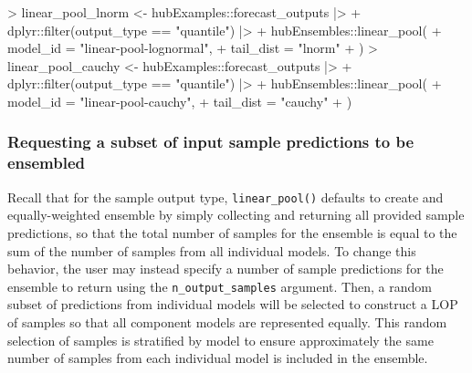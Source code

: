 \documentclass[
  letterpaper,
  DIV=11,
  numbers=noendperiod]{scrartcl}
\newenvironment{Shaded}{\begin{snugshade}}{\end{snugshade}}
\newcommand{\AttributeTok}[1]{\textcolor[rgb]{0.40,0.45,0.13}{#1}}
\newcommand{\FunctionTok}[1]{\textcolor[rgb]{0.28,0.35,0.67}{#1}}
\newcommand{\NormalTok}[1]{\textcolor[rgb]{0.00,0.23,0.31}{#1}}
\newcommand{\OtherTok}[1]{\textcolor[rgb]{0.00,0.23,0.31}{#1}}
\newcommand{\SpecialCharTok}[1]{\textcolor[rgb]{0.37,0.37,0.37}{#1}}
\newcommand{\StringTok}[1]{\textcolor[rgb]{0.13,0.47,0.30}{#1}}
\begin{document}
\begin{Shaded}
\begin{Highlighting}[]
\SpecialCharTok{\textgreater{}}\NormalTok{ linear\_pool\_lnorm }\OtherTok{\textless{}{-}}\NormalTok{ hubExamples}\SpecialCharTok{::}\NormalTok{forecast\_outputs }\SpecialCharTok{|\textgreater{}}
\SpecialCharTok{+}\NormalTok{     dplyr}\SpecialCharTok{::}\FunctionTok{filter}\NormalTok{(output\_type }\SpecialCharTok{==} \StringTok{"quantile"}\NormalTok{) }\SpecialCharTok{|\textgreater{}}
\SpecialCharTok{+}\NormalTok{     hubEnsembles}\SpecialCharTok{::}\FunctionTok{linear\_pool}\NormalTok{(}
\SpecialCharTok{+}       \AttributeTok{model\_id =} \StringTok{"linear{-}pool{-}lognormal"}\NormalTok{,}
\SpecialCharTok{+}       \AttributeTok{tail\_dist =} \StringTok{"lnorm"}
\SpecialCharTok{+}\NormalTok{     )}
\SpecialCharTok{\textgreater{}}\NormalTok{   linear\_pool\_cauchy }\OtherTok{\textless{}{-}}\NormalTok{ hubExamples}\SpecialCharTok{::}\NormalTok{forecast\_outputs }\SpecialCharTok{|\textgreater{}}
\SpecialCharTok{+}\NormalTok{     dplyr}\SpecialCharTok{::}\FunctionTok{filter}\NormalTok{(output\_type }\SpecialCharTok{==} \StringTok{"quantile"}\NormalTok{) }\SpecialCharTok{|\textgreater{}}
\SpecialCharTok{+}\NormalTok{     hubEnsembles}\SpecialCharTok{::}\FunctionTok{linear\_pool}\NormalTok{(}
\SpecialCharTok{+}       \AttributeTok{model\_id =} \StringTok{"linear{-}pool{-}cauchy"}\NormalTok{,}
\SpecialCharTok{+}       \AttributeTok{tail\_dist =} \StringTok{"cauchy"}
\SpecialCharTok{+}\NormalTok{     )}
\end{Highlighting}
\end{Shaded}

\subsubsection{Requesting a subset of input sample predictions to be
ensembled}\label{requesting-a-subset-of-input-sample-predictions-to-be-ensembled}

Recall that for the sample output type, \texttt{linear\_pool()} defaults
to create and equally-weighted ensemble by simply collecting and
returning all provided sample predictions, so that the total number of
samples for the ensemble is equal to the sum of the number of samples
from all individual models. To change this behavior, the user may
instead specify a number of sample predictions for the ensemble to
return using the \texttt{n\_output\_samples} argument. Then, a random
subset of predictions from individual models will be selected to
construct a LOP of samples so that all component models are represented
equally. This random selection of samples is stratified by model to
ensure approximately the same number of samples from each individual
model is included in the ensemble.
\end{document}
